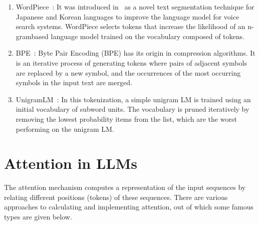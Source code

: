 \documentclass[a4paper,oneside]{book}
\begin{document}
\begin{enumerate}
    \item WordPiece~\cite{schuster2012japanese}: It was introduced in~\cite{schuster2012japanese} as a novel text segmentation technique for Japanese and Korean languages to improve the language model for voice search systems. WordPiece selects tokens that increase the likelihood of an n-grambased language model trained on the vocabulary composed of tokens.

    \item BPE~\cite{sennrich2015neural}: Byte Pair Encoding (BPE) has its origin in compression algorithms. It is an iterative process of generating tokens where pairs of adjacent symbols are replaced by a new symbol, and the occurrences of the most occurring symbols in the input text are merged.

    \item UnigramLM~\cite{kudo2018subword}: In this tokenization, a simple unigram LM is trained using an initial vocabulary of subword units. The vocabulary is pruned iteratively by removing the lowest probability items from the list, which are the worst performing on the unigram LM.
\end{enumerate}

\section{Attention in LLMs}
The attention mechanism computes a representation of the input sequences by relating different positions (tokens) of these sequences. There are various approaches to calculating and implementing attention, out of which some famous types are given below.
\end{document}
